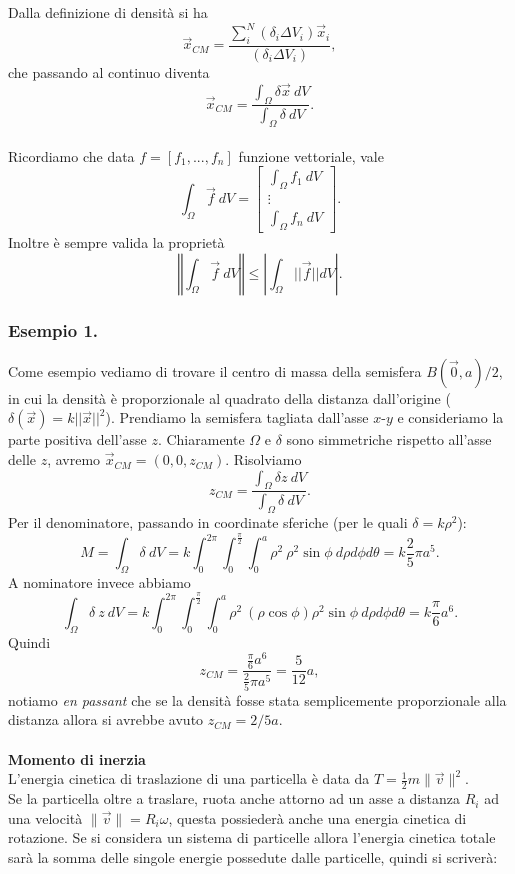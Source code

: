 \documentclass[10pt]{article}
\theoremstyle{plain}
\theoremstyle{definition}
\begin{document}
Dalla definizione di densità si ha 
$$\vec{x}_{CM}= \frac{\sum_i^N (\delta_i \Delta V_i) \vec{x} _i}{(\delta_i \Delta V_i)}, $$ che passando al continuo diventa
$$\vec{x}_{CM}= \frac{\int_\Omega \delta \vec{x} \ dV }{\int_\Omega \delta\  dV }. $$
\\ Ricordiamo che data $f= [f_1, ... , f_n]$ funzione vettoriale, vale
$$\int_\Omega \vec{f} \ dV = 
\begin{bmatrix}
\int_\Omega f_1\ dV \\
\vdots \\
\int_\Omega f_n\ dV
\end{bmatrix}
.$$
Inoltre è sempre valida la proprietà
$$\left \Vert \int_\Omega \vec{f} \ dV \right \Vert \leq \left \vert \int_\Omega ||\vec{f} || dV \right \vert . $$

\subsubsection{Esempio 1.}
Come esempio vediamo di trovare il centro di massa della semisfera $B(\vec{0}, a)/2$, in cui la densità è proporzionale al quadrato della distanza dall'origine ($\delta (\vec{x})= k ||\vec{x}|| ^2$). Prendiamo la semisfera tagliata dall'asse $x$-$y$ e consideriamo la parte positiva dell'asse $z$. Chiaramente $\Omega$ e $\delta$ sono simmetriche rispetto all'asse delle $z$, avremo $\vec{x}_{CM}=(0,0,z_{CM})$.
Risolviamo 
$$z_{CM}= \frac{\int_\Omega \delta z \ dV }{\int_\Omega \delta\  dV }. $$
Per il denominatore, passando in coordinate sferiche (per le quali $\delta= k \rho ^2$):
$$M= \int_\Omega \delta\  dV = k \int_0^{2\pi} \int_0^{\frac{\pi}{2}} \int_0^a \rho^2\ \rho^2 \sin\phi \ d\rho d\phi d\theta= k \frac{2}{5}\pi a^5.$$
A nominatore invece abbiamo
$$\int_\Omega \delta\ z\ dV = k \int_0^{2\pi} \int_0^{\frac{\pi}{2}} \int_0^a \rho^2\ (\rho \cos\phi) \rho^2 \sin\phi \ d\rho d\phi d\theta= k \frac{\pi}{6} a^6.$$
Quindi 
$$z_{CM}= \frac{\frac{\pi}{6}a^6}{\frac{2}{5}\pi a^5}= \frac{5}{12} a,$$ notiamo \textit{en passant} che se la densità fosse stata semplicemente proporzionale alla distanza allora si avrebbe avuto $z_{CM}=2/5a$.
\\
\\
\textbf{Momento di inerzia}\\
L'energia cinetica di traslazione di una particella è data da $T=\frac{1}{2}m\lVert\vec{v}\rVert^2$.\\
Se la particella oltre a traslare, ruota anche attorno ad un asse a distanza $R_i$ ad una velocità $\lVert \vec{v} \rVert = R_i \omega$, questa possiederà anche una energia cinetica di rotazione. Se si considera un sistema di particelle allora l'energia cinetica totale sarà la somma delle singole energie possedute dalle particelle, quindi si scriverà:
\end{document}
